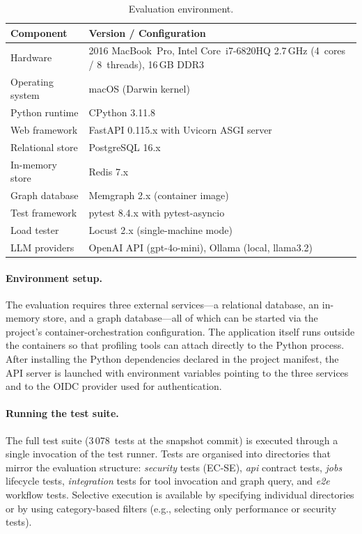 \documentclass[a4paper]{sapthesis}
\begin{document}
\begin{table}[ht]
\centering
\caption{Evaluation environment.}
\label{tab:app-env}
\small
\begin{tabularx}{\textwidth}{@{}l X@{}}
    \hline
    \textbf{Component} & \textbf{Version / Configuration} \\
    \hline
    Hardware          & 2016 MacBook~Pro, Intel Core~i7-6820HQ 2.7\,GHz (4~cores / 8~threads), 16\,GB DDR3 \\
    Operating system  & macOS (Darwin kernel) \\
    Python runtime    & CPython 3.11.8 \\
    Web framework     & FastAPI 0.115.x with Uvicorn ASGI server \\
    Relational store  & PostgreSQL 16.x \\
    In-memory store   & Redis 7.x \\
    Graph database    & Memgraph 2.x (container image) \\
    Test framework    & pytest 8.4.x with pytest-asyncio \\
    Load tester       & Locust 2.x (single-machine mode) \\
    LLM providers     & OpenAI API (gpt-4o-mini), Ollama (local, llama3.2) \\
    \hline
\end{tabularx}
\end{table}

\paragraph{Environment setup.}
The evaluation requires three external services---a relational database,
an in-memory store, and a graph database---all of which can be started
via the project's container-orchestration configuration.  The
application itself runs outside the containers so that profiling tools
can attach directly to the Python process.  After installing the Python
dependencies declared in the project manifest, the API server is
launched with environment variables pointing to the three services and
to the OIDC provider used for authentication.

\paragraph{Running the test suite.}
The full test suite (3\,078~tests at the snapshot commit) is executed
through a single invocation of the test runner.  Tests are organised
into directories that mirror the evaluation structure:
\emph{security} tests (EC-SE), \emph{api} contract tests,
\emph{jobs} lifecycle tests, \emph{integration} tests for tool
invocation and graph query, and \emph{e2e} workflow tests.  Selective
execution is available by specifying individual directories or by using
category-based filters (e.g., selecting only performance or security
tests).
\end{document}
